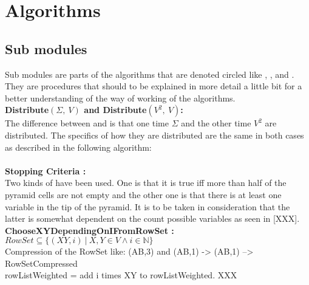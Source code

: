 
\section{Algorithms}\label{algorithms}
\subsection{Sub modules}
Sub modules are parts of the algorithms that are denoted circled like , ,  and . They are procedures that should to be explained in more detail a little bit for a better understanding of the way of working of the algorithms.\\

\noindent \textbf{Distribute$(\Sigma,\ V) $ and Distribute$(V^2,\ V)$:}\\
The difference between  and  is that one time $\Sigma$ and the other time $V^2$ are distributed. The specifics of how they are distributed are the same in both cases as described in the following algorithm:\\

\noindent
{} \\

\noindent \textbf{Stopping Criteria :}\\
Two kinds of  have been used. One is that it is true iff more than half of the pyramid cells are not empty and the other one is that there is at least one variable in the tip of the pyramid. It is to be taken in consideration that the latter is somewhat dependent on the count possible variables as seen in [XXX]. \\

\noindent \textbf{ChooseXYDependingOnIFromRowSet :}\\
$RowSet \subseteq \{(XY,i)\ |\ X,Y \in V \wedge i \in \mathbb{N} \}$\\
Compression of the RowSet like: (AB,3) and (AB,1) -> (AB,1) --> RowSetCompressed\\
rowListWeighted = add i times XY to rowListWeighted. XXX

